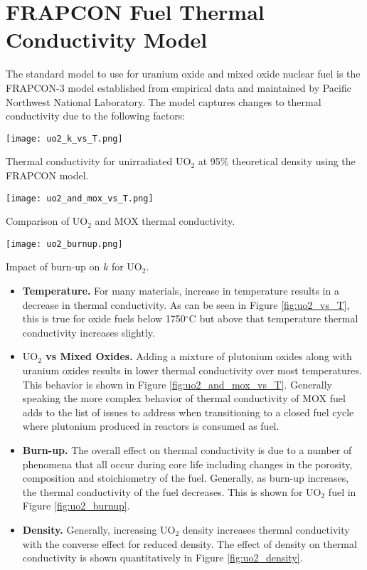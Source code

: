 \section{FRAPCON Fuel Thermal Conductivity Model} 
The standard model to use for uranium oxide and mixed oxide nuclear fuel is the FRAPCON-3 model established from empirical data and maintained by Pacific Northwest National Laboratory.\cite[-2.0cm]{lanning2005frapcon} The model captures changes to thermal conductivity due to the following factors:
\begin{marginfigure}
\texttt{[image: uo2\_k\_vs\_T.png]}
\caption{Thermal conductivity for unirradiated $\text{UO}_2$ at 95\% theoretical density using the FRAPCON model.}
\label{fig:uo2_vs_T}
\end{marginfigure}

\begin{marginfigure}
\texttt{[image: uo2\_and\_mox\_vs\_T.png]}
\caption{Comparison of $\text{UO}_2$ and MOX thermal conductivity.}
\label{fig:uo2_and_mox_vs_T}
\end{marginfigure}

\begin{marginfigure}
\texttt{[image: uo2\_burnup.png]}
\caption{Impact of burn-up on $k$ for UO$_{2}$.}
\label{fig:uo2_burnup}
\end{marginfigure}

\begin{itemize}
\item \textbf{Temperature.} For many materials, increase in temperature results in a decrease in thermal conductivity.  As can be seen in Figure \ref{fig:uo2_vs_T}, this is true for oxide fuels below 1750$^{\circ}$C but above that temperature thermal conductivity increases slightly.   
\item \textbf{$\text{UO}_2$ vs Mixed Oxides.}  Adding a mixture of plutonium oxides along with uranium oxides results in lower thermal conductivity over most temperatures.  This behavior is shown in Figure \ref{fig:uo2_and_mox_vs_T}.  Generally speaking the more complex behavior of thermal conductivity of MOX fuel adds to the list of issues to address when transitioning to a closed fuel cycle where plutonium produced in reactors is consumed as fuel.
\item \textbf{Burn-up.}  The overall effect on thermal conductivity is due to a number of phenomena that all occur during core life including changes in the porosity, composition and stoichiometry of the fuel.  Generally, as burn-up increases, the thermal conductivity of the fuel decreases.  This is shown for $\text{UO}_2$ fuel in Figure \ref{fig:uo2_burnup}.  
\item \textbf{Density.} Generally, increasing UO$_{2}$ density increases thermal conductivity with the converse effect for reduced density.  The effect of density on thermal conductivity is shown quantitatively in Figure \ref{fig:uo2_density}.
\end{itemize}

